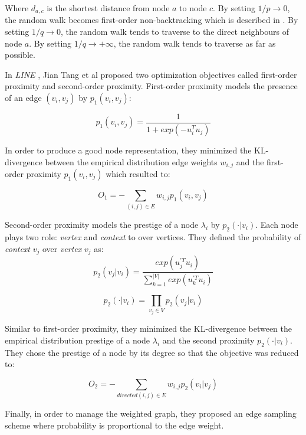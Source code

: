 Where $d_{a, c}$ is the shortest distance from node $a$ to node $c$. By setting $1/p \to 0$, the random walk becomes first-order non-backtracking which is described in \cite{krzakala2013spectral}. By setting $1/q \to 0$, the random walk tends to traverse to the direct neighbours of node $a$. By setting $1/q \to +\infty$, the random walk tends to traverse as far as possible.

In \emph{LINE} \cite{tang2015line}, Jian Tang et al proposed two optimization objectives called first-order proximity and second-order proximity. First-order proximity models the presence of an edge $(v_i, v_j)$ by $p_1(v_i, v_j)$:

\begin{equation}
    p_1(v_i, v_j) = \frac{1}{1 + exp(-u_i^T u_j)}
\end{equation}

In order to produce a good node representation, they minimized the KL-divergence between the empirical distribution edge weights $w_{i, j}$ and the first-order proximity $p_1(v_i, v_j)$ which resulted to:

\begin{equation}
    O_1 = - \sum_{(i, j) \in E} w_{i, j} p_1(v_i, v_j)
\end{equation}

Second-order proximity models the prestige of a node $\lambda_i$ by $p_2(\cdot | v_i)$. Each node plays two role: \emph{vertex} and \emph{context} to over vertices. They defined the probability of \emph{context} $v_j$ over \emph{vertex} $v_j$ as:
\begin{equation}
    p_2(v_j | v_i) = \frac{exp(u_j^{'T} u_i)}{\sum_{k=1}^{|V|} exp(u_k^{'T} u_i)}
\end{equation}

\begin{equation}
    p_2(\cdot | v_i) = \prod_{v_j \in V} p_2(v_j | v_i)
\end{equation}

Similar to first-order proximity, they minimized the KL-divergence between the empirical distribution prestige of a node $\lambda_i$ and the second proximity $p_2(\cdot | v_i)$. They chose the prestige of a node by its degree so that the objective was reduced to:

\begin{equation}
    O_2 = - \sum_{directed (i, j) \in E} w_{i, j} p_2(v_i | v_j)
\end{equation}

Finally, in order to manage the weighted graph, they proposed an edge sampling scheme where probability is proportional to the edge weight.


